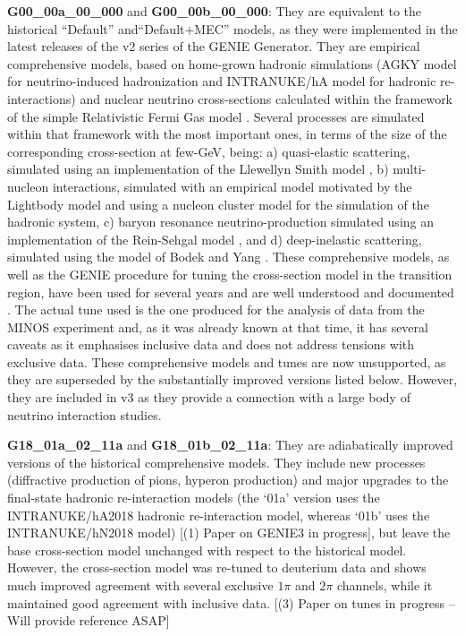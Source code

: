 {\bf G00\_00a\_00\_000} and {\bf G00\_00b\_00\_000}: They are equivalent to the historical ``Default'' and``Default+MEC'' models, as they were implemented in the latest releases of the v2 series of the GENIE Generator. They are empirical comprehensive models, based on home-grown hadronic simulations (AGKY model \cite{Yang:2009zx} for neutrino-induced hadronization and INTRANUKE/hA model \cite{Dytman:2015taa} for hadronic re-interactions) and nuclear neutrino cross-sections calculated within the framework of the simple Relativistic Fermi Gas model \cite{Bodek:1981wr}. Several processes are simulated within that framework with the most important ones, in terms of the size of the corresponding cross-section at few-GeV, being: a) quasi-elastic scattering, simulated using an implementation of the Llewellyn Smith model \cite{LlewellynSmith:1971uhs}, b) multi-nucleon interactions, simulated with an empirical model motivated by the Lightbody model \cite{Lightbody:1988gcu} and using a nucleon cluster model for the simulation of the hadronic system, c) baryon resonance neutrino-production simulated using an implementation of the Rein-Sehgal model \cite{Rein:1980wg}, and d) deep-inelastic scattering, simulated using the model of Bodek and Yang \cite{Bodek:2002ps}.  These comprehensive models, as well as the GENIE procedure for tuning the cross-section model in the transition region, have been used for several years and are well understood and documented \cite{Andreopoulos:2009rq}. The actual tune used is the one produced for the analysis of data from the MINOS experiment and, as it was already known at that time, it has several caveats as it emphasises inclusive data and does not address tensions with exclusive data. These comprehensive models and tunes are now unsupported, as they are superseded by the substantially improved versions listed below. However, they are included in v3 as they provide a connection with a large body of neutrino interaction studies.

{\bf G18\_01a\_02\_11a} and {\bf G18\_01b\_02\_11a}: They are adiabatically improved versions of the historical comprehensive models. They include new processes (diffractive production of pions, hyperon production) and major upgrades to the final-state hadronic re-interaction models (the `01a' version uses the INTRANUKE/hA2018 hadronic re-interaction model, whereas `01b' uses the INTRANUKE/hN2018 model) [(1) Paper on GENIE3 in progress], but leave the base cross-section model unchanged with respect to the historical model. However, the cross-section model was re-tuned to deuterium data and shows much improved agreement with several exclusive $1\pi$ and $2\pi$ channels, while it maintained good agreement with inclusive data. [(3) Paper on tunes in progress -- Will provide reference ASAP]

